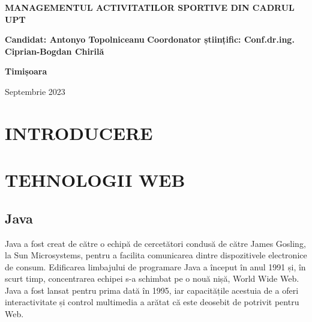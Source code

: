 \documentclass[a4paper,12pt]{article}
\begin{document}
    \begin{titlepage}
    \vspace*{\fill}
    \begin{center}
        \huge{\textbf{\uppercase{Managementul activitatilor sportive din cadrul UPT}}}
    \end{center}
    \vfill
    \begin{flushleft}
        \Large{
            \textbf{Candidat: Antonyo Topolniceanu}
            \newline
            \newline
            \textbf{Coordonator științific: Conf.dr.ing. Ciprian-Bogdan Chirilă}
        }
        \newline
        \newline
    \end{flushleft}
    \begin{center}
        \Large{
            \textbf{Timișoara}
        }
    \end{center}
    \begin{center}
        \Large{
            Septembrie 2023
        }
    \end{center}
    \end{titlepage}

    \tableofcontents

    \section*{\huge{}}

    \section{\Large\centering\uppercase{Introducere}}

    \section{\Large\centering\uppercase{Tehnologii web}}

    \subsection{Java}
    Java a fost creat de către o echipă de cercetători condusă de către James
    Gosling, la Sun Microsystems, pentru a facilita comunicarea dintre dispozitivele
    electronice de consum. Edificarea limbajului de programare Java a început în anul 1991 și,
    în scurt timp, concentrarea echipei s-a schimbat pe o nouă nișă, World Wide Web.
    Java a fost lansat pentru prima dată în 1995, iar capacitățile acestuia de a oferi
    interactivitate și control multimedia a arătat că este deosebit de potrivit pentru Web.
    
\end{document}
